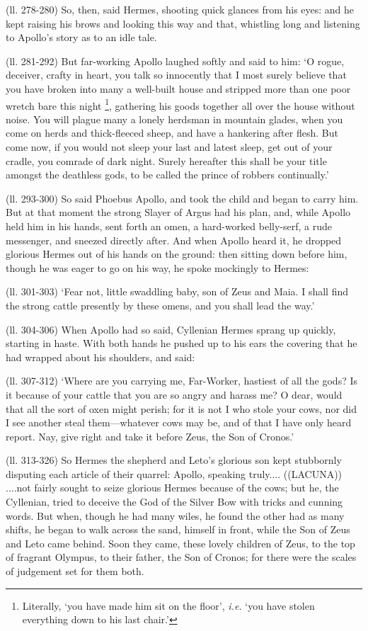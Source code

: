 (ll. 278-280) So, then, said Hermes, shooting quick glances from his eyes: and
he kept raising his brows and looking this way and that, whistling long and
listening to Apollo’s story as to an idle tale.

(ll. 281-292) But far-working Apollo laughed softly and said to him: ‘O
rogue, deceiver, crafty in heart, you talk so innocently that I most surely
believe that you have broken into many a well-built house and stripped more
than one poor wretch bare this night \footnote{Literally, ‘you have
made him sit on the floor’, \emph{i.e.} ‘you have stolen everything
down to his last chair.’},
gathering his goods together all over the house without noise. You will plague
many a lonely herdsman in mountain glades, when you come on herds and
thick-fleeced sheep, and have a hankering after flesh. But come now, if you
would not sleep your last and latest sleep, get out of your cradle, you comrade
of dark night. Surely hereafter this shall be your title amongst the deathless
gods, to be called the prince of robbers continually.’

(ll. 293-300) So said Phoebus Apollo, and took the child and began to carry
him. But at that moment the strong Slayer of Argus had his plan, and, while
Apollo held him in his hands, sent forth an omen, a hard-worked belly-serf, a
rude messenger, and sneezed directly after. And when Apollo heard it, he
dropped glorious Hermes out of his hands on the ground: then sitting down
before him, though he was eager to go on his way, he spoke mockingly to Hermes:

(ll. 301-303) ‘Fear not, little swaddling baby, son of Zeus and Maia. I
shall find the strong cattle presently by these omens, and you shall lead the
way.’

(ll. 304-306) When Apollo had so said, Cyllenian Hermes sprang up quickly,
starting in haste. With both hands he pushed up to his ears the covering that
he had wrapped about his shoulders, and said:

(ll. 307-312) ‘Where are you carrying me, Far-Worker, hastiest of all the
gods? Is it because of your cattle that you are so angry and harass me? O dear,
would that all the sort of oxen might perish; for it is not I who stole your
cows, nor did I see another steal them—whatever cows may be, and of that
I have only heard report. Nay, give right and take it before Zeus, the Son of
Cronos.’

(ll. 313-326) So Hermes the shepherd and Leto’s glorious son kept
stubbornly disputing each article of their quarrel: Apollo, speaking truly....
((LACUNA)) ....not fairly sought to seize glorious Hermes because of the cows;
but he, the Cyllenian, tried to deceive the God of the Silver Bow with tricks
and cunning words. But when, though he had many wiles, he found the other had
as many shifts, he began to walk across the sand, himself in front, while the
Son of Zeus and Leto came behind. Soon they came, these lovely children of
Zeus, to the top of fragrant Olympus, to their father, the Son of Cronos; for
there were the scales of judgement set for them both.

